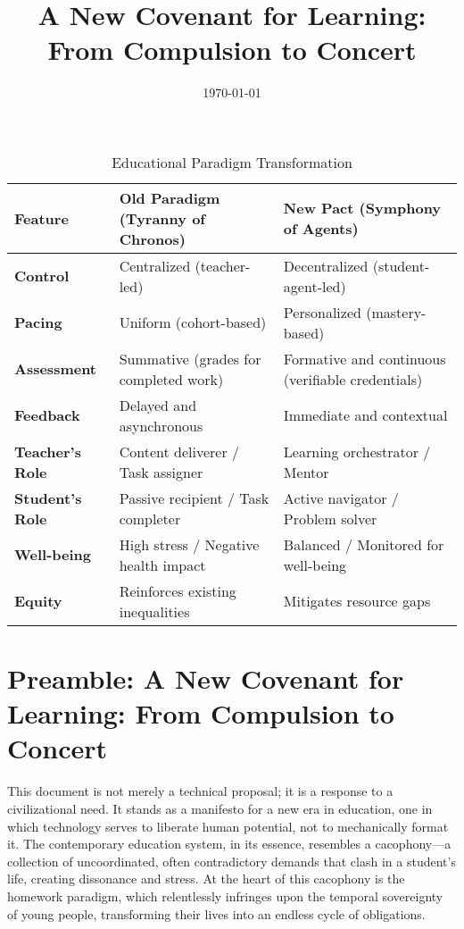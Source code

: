 \documentclass[12pt,a4paper]{article}
\title{A New Covenant for Learning: From Compulsion to Concert}
\author{}
\date{\today}
\begin{document}
\maketitle
\tableofcontents
\newpage

\begin{table}[htbp]
\centering
\caption{Educational Paradigm Transformation}
\label{tab:paradigm_shift}
\small
\begin{tabularx}{\textwidth}{@{}lXX@{}}
\toprule
\textbf{Feature} & \textbf{Old Paradigm (Tyranny of Chronos)} & \textbf{New Pact (Symphony of Agents)} \\
\midrule
\textbf{Control}    & Centralized (teacher-led)                 & Decentralized (student-agent-led) \\
\textbf{Pacing}     & Uniform (cohort-based)                    & Personalized (mastery-based) \\
\textbf{Assessment} & Summative (grades for completed work)     & Formative and continuous (verifiable credentials) \\
\textbf{Feedback}   & Delayed and asynchronous                  & Immediate and contextual \\
\textbf{Teacher's Role} & Content deliverer / Task assigner      & Learning orchestrator / Mentor \\
\textbf{Student's Role} & Passive recipient / Task completer     & Active navigator / Problem solver \\
\textbf{Well-being} & High stress / Negative health impact      & Balanced / Monitored for well-being \\
\textbf{Equity}     & Reinforces existing inequalities          & Mitigates resource gaps \\
\bottomrule
\end{tabularx}
\end{table}

\section*{Preamble: A New Covenant for Learning: From Compulsion to Concert}
This document is not merely a technical proposal; it is a response to a civilizational need. It stands as a manifesto for a new era in education, one in which technology serves to liberate human potential, not to mechanically format it. The contemporary education system, in its essence, resembles a cacophony---a collection of uncoordinated, often contradictory demands that clash in a student's life, creating dissonance and stress. At the heart of this cacophony is the homework paradigm, which relentlessly infringes upon the temporal sovereignty of young people, transforming their lives into an endless cycle of obligations.
\end{document}
